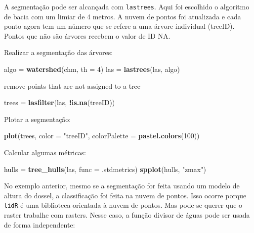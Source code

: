 \documentclass[
]{book}
\newenvironment{Shaded}{\begin{snugshade}}{\end{snugshade}}
\newcommand{\DataTypeTok}[1]{\textcolor[rgb]{0.13,0.29,0.53}{#1}}
\newcommand{\DecValTok}[1]{\textcolor[rgb]{0.00,0.00,0.81}{#1}}
\newcommand{\KeywordTok}[1]{\textcolor[rgb]{0.13,0.29,0.53}{\textbf{#1}}}
\newcommand{\NormalTok}[1]{#1}
\newcommand{\OperatorTok}[1]{\textcolor[rgb]{0.81,0.36,0.00}{\textbf{#1}}}
\newcommand{\StringTok}[1]{\textcolor[rgb]{0.31,0.60,0.02}{#1}}
\begin{document}
A segmentação pode ser alcançada com \texttt{lastrees}. Aqui foi escolhido o algoritmo de bacia com um limiar de 4 metros. A nuvem de pontos foi atualizada e cada ponto agora tem um número que se refere a uma árvore individual (treeID). Pontos que não são árvores recebem o valor de ID NA.

Realizar a segmentação das árvores:

\begin{Shaded}
\begin{Highlighting}[]
\NormalTok{algo =}\StringTok{ }\KeywordTok{watershed}\NormalTok{(chm, }\DataTypeTok{th =} \DecValTok{4}\NormalTok{)}
\NormalTok{las  =}\StringTok{ }\KeywordTok{lastrees}\NormalTok{(las, algo)}
\end{Highlighting}
\end{Shaded}

remove points that are not assigned to a tree

\begin{Shaded}
\begin{Highlighting}[]
\NormalTok{trees =}\StringTok{ }\KeywordTok{lasfilter}\NormalTok{(las, }\OperatorTok{!}\KeywordTok{is.na}\NormalTok{(treeID))}
\end{Highlighting}
\end{Shaded}

Plotar a segmentação:

\begin{Shaded}
\begin{Highlighting}[]
\KeywordTok{plot}\NormalTok{(trees, }\DataTypeTok{color =} \StringTok{"treeID"}\NormalTok{, }\DataTypeTok{colorPalette =} \KeywordTok{pastel.colors}\NormalTok{(}\DecValTok{100}\NormalTok{))}
\end{Highlighting}
\end{Shaded}

Calcular algumas métricas:

\begin{Shaded}
\begin{Highlighting}[]
\NormalTok{hulls  =}\StringTok{ }\KeywordTok{tree_hulls}\NormalTok{(las, }\DataTypeTok{func =}\NormalTok{ .stdmetrics)}
\KeywordTok{spplot}\NormalTok{(hulls, }\StringTok{"zmax"}\NormalTok{)}
\end{Highlighting}
\end{Shaded}

No exemplo anterior, mesmo se a segmentação for feita usando um modelo de altura do dossel, a classificação foi feita na nuvem de pontos. Isso ocorre porque \texttt{lidR} é uma biblioteca orientada à nuvem de pontos. Mas pode-se querer que o raster trabalhe com rasters. Nesse caso, a função divisor de águas pode ser usada de forma independente:
\end{document}
